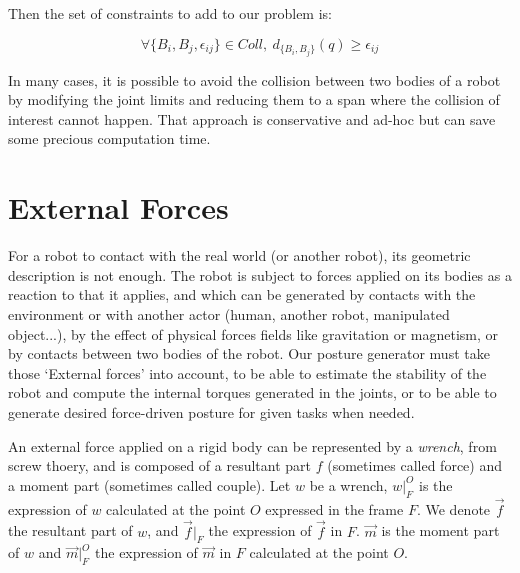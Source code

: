 Then the set of constraints to add to our problem is:

\begin{equation}
  \boxed{\forall \{B_i, B_j, \epsilon_{ij}\} \in Coll,\ d_{\{B_i, B_j\}}(q) \geq \epsilon_{ij}}
\end{equation}

In many cases, it is possible to avoid the collision between two bodies of a robot by modifying the joint limits and reducing them to a span where the collision of interest cannot happen.
That approach is conservative and ad-hoc but can save some precious computation time.




\section{External Forces}
\label{sec:external_forces}


For a robot to contact with the real world (or another robot), its geometric description is not enough.
The robot is subject to forces applied on its bodies as a reaction to that it applies, and which can be generated by contacts with the environment or with another actor (human, another robot, manipulated object...), by the effect of physical forces fields like gravitation or magnetism, or by contacts between two bodies of the robot.
Our posture generator must take those `External forces' into account, to be able to estimate the stability of the robot and compute the internal torques generated in the joints, or to be able to generate desired force-driven posture for given tasks when needed.

An external force applied on a rigid body can be represented by a \emph{wrench}, from screw thoery, and is composed of a resultant part $f$ (sometimes called force) and a moment part (sometimes called couple).
Let $w$ be a wrench, $w|_F^O$ is the expression of $w$ calculated at the point $O$ expressed in the frame $F$.
We denote $\vec{f}$ the resultant part of $w$, and $\vec{f}|_F$ the expression of $\vec{f}$ in $F$.
$\vec{m}$ is the moment part of $w$ and $\vec{m}|_F^O$ the expression of $\vec{m}$ in $F$ calculated at the point $O$.

